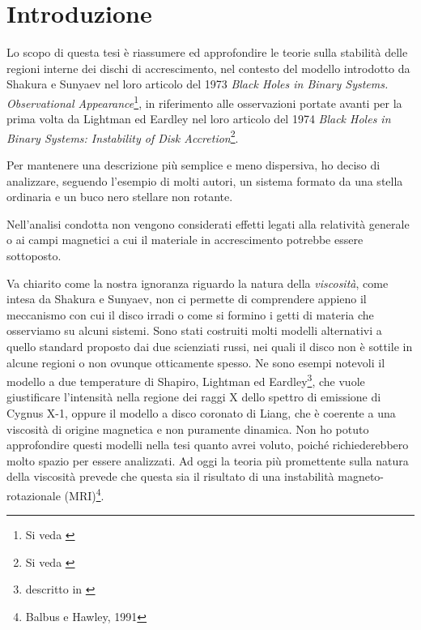 \documentclass[a4paperbi]{article}
\begin{document}
\newpage
\vspace*{\fill}
\tableofcontents
\vspace*{\fill}

\newpage
\section{Introduzione}
	Lo scopo di questa tesi è riassumere ed approfondire le teorie sulla stabilità delle regioni interne dei dischi di accrescimento, nel contesto del modello introdotto da Shakura e Sunyaev nel loro articolo del 1973 \textit{Black Holes in Binary Systems. Observational Appearance}\footnote{Si veda \cite{ShakuraSunyaev1973}}, in riferimento alle osservazioni portate avanti per la prima volta da Lightman ed Eardley nel loro articolo del 1974 \textit{Black Holes in Binary Systems: Instability of Disk Accretion}\footnote{Si veda \cite{LightmanEardley1974}}.

	Per mantenere una descrizione più semplice e meno dispersiva, ho deciso di analizzare, seguendo l'esempio di molti autori, un sistema formato da una stella ordinaria e un buco nero stellare non rotante. 
	
	Nell'analisi condotta non vengono considerati effetti legati alla relatività generale o ai campi magnetici a cui il materiale in accrescimento potrebbe essere sottoposto.

	Va chiarito come la nostra ignoranza riguardo la natura della \textit{viscosità}, come intesa da Shakura e Sunyaev, non ci permette di comprendere appieno il meccanismo con cui il disco irradi o come si formino i getti di materia che osserviamo su alcuni sistemi. Sono stati costruiti molti modelli alternativi a quello standard proposto dai due scienziati russi, nei quali il disco non è sottile in alcune regioni o non ovunque otticamente spesso. Ne sono esempi notevoli il modello a due temperature di Shapiro, Lightman ed Eardley\footnote{descritto in \cite{ShapiroLightmanEardley1976}}, che vuole giustificare l'intensità nella regione dei raggi X dello spettro di emissione di Cygnus X-1, oppure il modello a disco coronato di Liang, che è coerente a una viscosità di origine magnetica e non puramente dinamica. Non ho potuto approfondire questi modelli nella tesi quanto avrei voluto, poiché richiederebbero molto spazio per essere analizzati. Ad oggi la teoria più promettente sulla natura della viscosità prevede che questa sia il risultato di una instabilità magneto-rotazionale (MRI)\footnote{Balbus e Hawley, 1991}.
\end{document}
